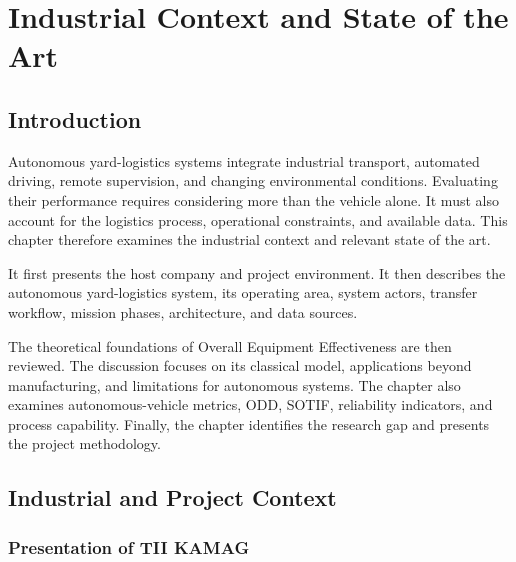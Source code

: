 
\chapter{Industrial Context and State of the Art}

\section{Introduction}

Autonomous yard-logistics systems integrate industrial transport, automated driving, remote supervision, and changing environmental conditions. Evaluating their performance requires considering more than the vehicle alone. It must also account for the logistics process, operational constraints, and available data. This chapter therefore examines the industrial context and relevant state of the art.

It first presents the host company and project environment. It then describes the autonomous yard-logistics system, its operating area, system actors, transfer workflow, mission phases, architecture, and data sources.

The theoretical foundations of Overall Equipment Effectiveness are then reviewed. The discussion focuses on its classical model, applications beyond manufacturing, and limitations for autonomous systems. The chapter also examines autonomous-vehicle metrics, ODD, SOTIF, reliability indicators, and process capability. Finally, the chapter identifies the research gap and presents the project methodology.

\section{Industrial and Project Context}

\subsection{Presentation of TII KAMAG}

